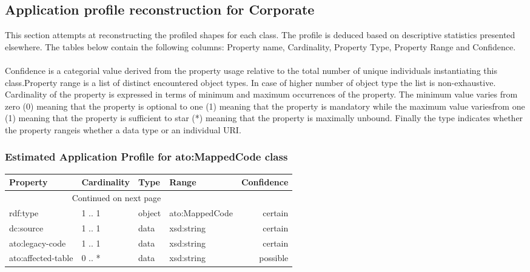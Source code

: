 \documentclass[10pt,a4paper,titlepage,final]{article}
\begin{document}
\subsection{Application profile reconstruction for Corporate}
This section attempts at reconstructing the profiled shapes for each class. The profile is deduced based on descriptive statistics presented elsewhere. The tables below contain the following columns: Property name, Cardinality, Property Type, Property Range and Confidence. \\\\ Confidence is a categorial value derived from the property usage relative to the total number of unique individuals instantiating this class.Property range is a list of distinct encountered object types. In case of higher number of object type the list is non{-}exhaustive. Cardinality of the property is expressed in terms of minimum and maximum occurrences of the property. The minimum value varies from zero (0) meaning that the property is optional to one (1) meaning that the property is mandatory while the maximum value variesfrom one (1) meaning that the property is sufficient to star (*) meaning that the property is maximally unbound. Finally the type indicates whether the property rangeis whether a data type or an individual URI.
\subsubsection{Estimated Application Profile for ato:MappedCode class}
\begin{tabularx}{\textwidth}{lllXr}
\toprule
           Property & Cardinality &    Type &           Range & Confidence \\
\midrule
\endhead
\midrule
\multicolumn{3}{r}{{Continued on next page}} \\
\midrule
\endfoot

\bottomrule
\endlastfoot
           rdf:type &      1 .. 1 &  object &  ato:MappedCode &    certain \\
          dc:source &      1 .. 1 &    data &      xsd:string &    certain \\
    ato:legacy-code &      1 .. 1 &    data &      xsd:string &    certain \\
 ato:affected-table &      0 .. * &    data &      xsd:string &   possible \\
\end{tabularx}
\end{document}
